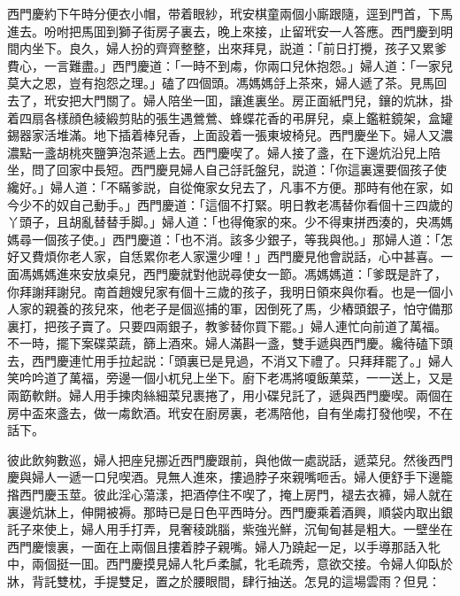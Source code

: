 西門慶約下午時分便衣小帽，带着眼紗，玳安棋童兩個小廝跟隨，逕到門首，下馬進去。吩咐把馬囬到獅子街房子裏去，晚上來接，止留玳安一人答應。西門慶到明間内坐下。良久，婦人扮的齊齊整整，出來拜見，説道：「前日打攪，孩子又累爹費心，一言難盡。」西門慶道：「一時不到䖏，你兩口兒休抱怨。」婦人道：「一家兒莫大之恩，豈有抱怨之理。」磕了四個頭。馮媽媽㧱上茶來，婦人遞了茶。見馬回去了，玳安把大門關了。婦人陪坐一囬，讓進裏坐。房正面紙門兒，鑲的炕牀，掛着四扇各樣顔色綾緞剪貼的張生遇鶯鶯、蜂蝶花香的弔屏兒，桌上鑑粧鏡架，盒罐錫器家活堆滿。地下插着棒兒香，上面設着一張東坡椅兒。西門慶坐下。婦人又濃濃點一盞胡桃夾鹽笋泡茶遞上去。西門慶喫了。婦人接了盞，在下邊炕沿兒上陪坐，問了回家中長短。西門慶見婦人自己㧱託盤兒，説道：「你這裏還要個孩子使纔好。」婦人道：「不瞞爹説，自從俺家女兒去了，凡事不方便。那時有他在家，如今少不的奴自己動手。」西門慶道：「這個不打緊。明日教老馮替你看個十三四歲的丫頭子，且胡亂替替手脚。」婦人道：「也得俺家的來。少不得東拼西湊的，央馮媽媽尋一個孩子使。」西門慶道：「也不消。該多少銀子，等我與他。」那婦人道：「怎好又費煩你老人家，自恁累你老人家還少哩！」西門慶見他會説話，心中甚喜。一面馮媽媽進來安放桌兒，西門慶就對他説尋使女一節。馮媽媽道：「爹既是許了，你拜謝拜謝兒。南首趙嫂兒家有個十三歲的孩子，我明日領來與你看。也是一個小人家的親養的孩兒來，他老子是個巡捕的軍，因倒死了馬，少樁頭銀子，怕守備那裏打，把孩子賣了。只要四兩銀子，教爹替你買下罷。」婦人連忙向前道了萬福。不一時，擺下案碟菜蔬，篩上酒來。婦人滿斟一盞，雙手遞與西門慶。纔待磕下頭去，西門慶連忙用手拉起説：「頭裏已是見過，不消又下禮了。只拜拜罷了。」婦人笑吟吟道了萬福，旁邊一個小杌兒上坐下。廚下老馮將嗄飯菓菜，一一送上，又是兩筯軟餅。婦人用手揀肉絲細菜兒裹捲了，用小碟兒託了，遞與西門慶喫。兩個在房中盃來盞去，做一䖏飲酒。玳安在廚房裏，老馮陪他，自有坐䖏打發他喫，不在話下。

彼此飲夠數巡，婦人把座兒挪近西門慶跟前，與他做一處説話，遞菜兒。然後西門慶與婦人一遞一口兒喫酒。見無人進來，摟過脖子來親嘴咂舌。婦人便舒手下邊籠揝西門慶玉莖。彼此淫心蕩漾，把酒停住不喫了，掩上房門，褪去衣褲，婦人就在裏邊炕牀上，伸開被褥。那時已是日色平西時分。西門慶乘着酒興，順袋内取出銀託子來使上，婦人用手打弄，見奢稜跳腦，紫強光鮮，沉甸甸甚是粗大。一壁坐在西門慶懷裏，一面在上兩個且摟着脖子親嘴。婦人乃蹺起一足，以手導那話入牝中，兩個挺一囬。西門慶摸見婦人牝戶柔膩，牝毛疏秀，意欲交接。令婦人仰臥於牀，背託雙枕，手提雙足，置之於腰眼間，肆行抽送。怎見的這場雲雨？但見：

